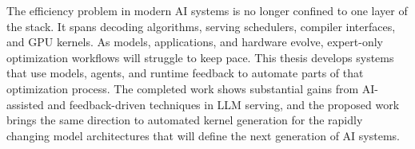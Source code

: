 \documentclass[11pt]{article}
\begin{document}
The efficiency problem in modern AI systems is no longer confined to one layer of the stack. It spans decoding algorithms, serving schedulers, compiler interfaces, and GPU kernels. As models, applications, and hardware evolve, expert-only optimization workflows will struggle to keep pace. This thesis develops systems that use models, agents, and runtime feedback to automate parts of that optimization process. The completed work shows substantial gains from AI-assisted and feedback-driven techniques in LLM serving, and the proposed work brings the same direction to automated kernel generation for the rapidly changing model architectures that will define the next generation of AI systems.



\end{document}
